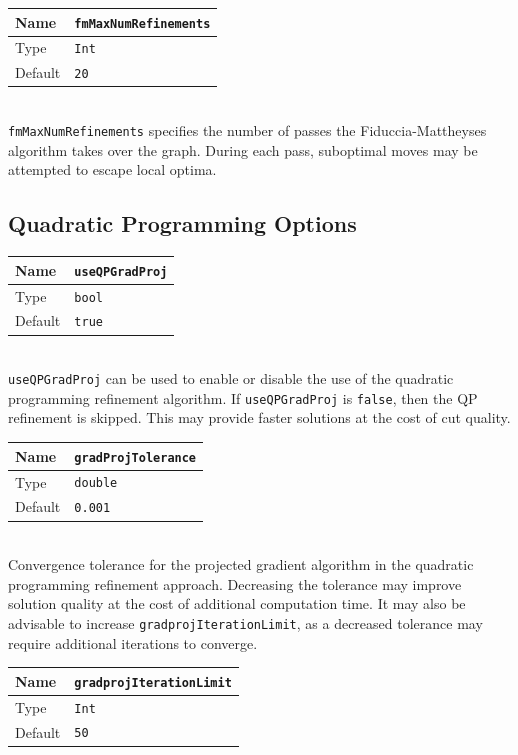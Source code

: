 \documentclass[letter]{article}
\begin{document}
\baselineskip
\begin{tabular}{|l|l|} \hline
Name & \texttt{fmMaxNumRefinements} \\ \hline
Type & \texttt{Int} \\ \hline
Default & \texttt{20} \\ \hline
\end{tabular}\\

\texttt{fmMaxNumRefinements} specifies the number of passes the Fiduccia-Mattheyses algorithm takes over the graph. During each pass, suboptimal moves may be attempted to escape local optima.

\subsection{Quadratic Programming Options}

\begin{tabular}{|l|l|} \hline
Name & \texttt{useQPGradProj} \\ \hline
Type & \texttt{bool} \\ \hline
Default & \texttt{true} \\ \hline
\end{tabular}\\

\texttt{useQPGradProj} can be used to enable or disable the use of the quadratic programming refinement algorithm. If \texttt{useQPGradProj} is \texttt{false}, then the QP refinement is skipped. This may provide faster solutions at the cost of cut quality.\\
\baselineskip
\begin{tabular}{|l|l|} \hline
Name & \texttt{gradProjTolerance} \\ \hline
Type & \texttt{double} \\ \hline
Default & \texttt{0.001} \\ \hline
\end{tabular}\\

Convergence tolerance for the projected gradient algorithm in the quadratic programming refinement approach.  Decreasing the tolerance may improve solution quality at the cost of additional computation time. It may also be advisable to increase \texttt{gradprojIterationLimit}, as a decreased tolerance may require additional iterations to converge.\\
\baselineskip
\begin{tabular}{|l|l|} \hline
Name & \texttt{gradprojIterationLimit} \\ \hline
Type & \texttt{Int} \\ \hline
Default & \texttt{50} \\ \hline
\end{tabular}\\
\end{document}
